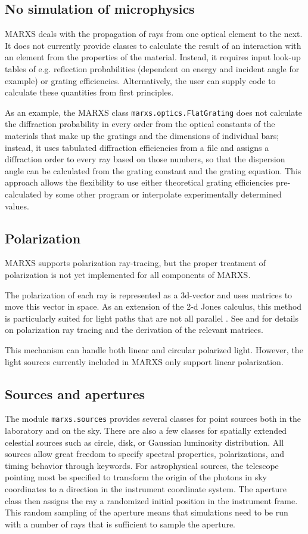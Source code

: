 \documentclass[twocolumn]{aastex61}
\begin{document}
\subsection{No simulation of microphysics}
MARXS deals with the propagation of rays from one optical element to the
next. It does not currently provide classes to calculate the result of an
interaction with an element from the properties of the material. Instead, it
requires input look-up tables of e.g. reflection probabilities (dependent on
energy and incident angle for example) or grating efficiencies. Alternatively,
the user can supply code to calculate these quantities from first principles.

As an example, the MARXS class \texttt{marxs.optics.FlatGrating} does not
calculate the diffraction probability in every order from the optical constants
of the materials that make up the gratings and the dimensions of individual
bars; instead, it uses tabulated diffraction efficiencies from a file and
assigns a diffraction order to every ray based on those numbers, so that the
dispersion angle can be calculated from the grating constant and the grating
equation. This approach allows the flexibility to use either theoretical
grating efficiencies pre-calculated by some other program or interpolate
experimentally determined values.


\subsection{Polarization}
MARXS supports polarization ray-tracing, but the proper treatment of
polarization is not yet implemented for all components of MARXS.

The polarization of each ray is represented as a 3d-vector and uses matrices to
move this vector in space. As an extension of the 2-d Jones calculus, this
method is particularly suited for light paths that are not all parallel
\citep{1992SPIE.1746...62C}. See \citet{Yun:11} and \citet{Yunthesis} for
details on polarization ray tracing and the derivation of the relevant
matrices.

This mechanism can handle both linear and circular polarized light. However,
the light sources currently included in MARXS only support linear polarization.


\subsection{Sources and apertures}
The module \texttt{marxs.sources} provides several classes for point sources
both in the laboratory and on the sky. There are also a few classes for
spatially extended celestial sources such as circle, disk, or Gaussian
luminosity distribution. All sources allow great freedom to specify spectral
properties, polarizations, and timing behavior through keywords. For
astrophysical sources, the telescope pointing most be specified to transform
the origin of the photons in sky coordinates to a direction in the instrument
coordinate system. The aperture class then assigns the ray a randomized initial
position in the instrument frame. This random sampling of the aperture means
that simulations need to be run with a number of rays that is sufficient to
sample the aperture.
\end{document}
